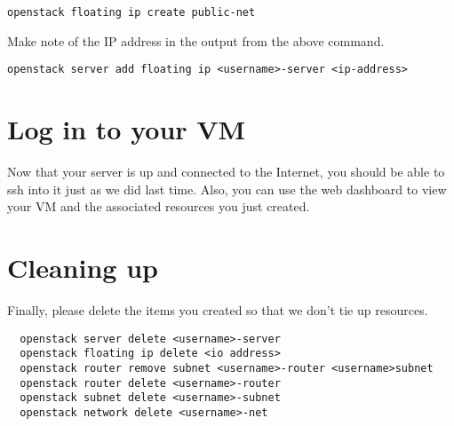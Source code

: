 \documentclass{article}
\begin{document}
  \texttt{openstack floating ip create public-net}
  
Make note of the IP address in the output from the above command.

 \texttt{openstack server add floating ip <username>-server <ip-address>}


\section{Log in to your VM}
Now that your server is up and connected to the Internet, you should be able to ssh into it just as we did last time. Also, you can use the web dashboard to view your VM and the associated resources you just created.

\section{Cleaning up}
Finally, please delete the items you created so that we don't tie up resources.

\begin{verbatim}
  openstack server delete <username>-server
  openstack floating ip delete <io address>
  openstack router remove subnet <username>-router <username>subnet
  openstack router delete <username>-router
  openstack subnet delete <username>-subnet
  openstack network delete <username>-net
\end{verbatim}
 
\end{document}
